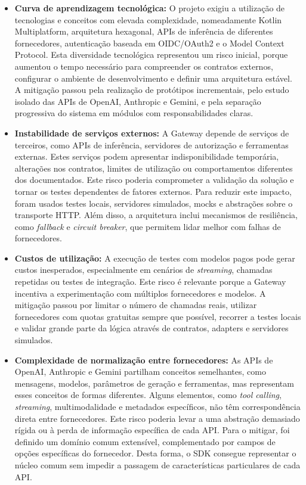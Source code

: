 \documentclass[11pt,a4paper]{report}
\begin{document}
    \begin{itemize}
        \item \textbf{Curva de aprendizagem tecnológica:}
        O projeto exigiu a utilização de tecnologias e conceitos com elevada complexidade, nomeadamente Kotlin Multiplatform, arquitetura hexagonal, APIs de inferência de diferentes fornecedores, autenticação baseada em OIDC/OAuth2 e o Model Context Protocol. Esta diversidade tecnológica representou um risco inicial, porque aumentou o tempo necessário para compreender os contratos externos, configurar o ambiente de desenvolvimento e definir uma arquitetura estável.
        A mitigação passou pela realização de protótipos incrementais, pelo estudo isolado das APIs de OpenAI, Anthropic e Gemini, e pela separação progressiva do sistema em módulos com responsabilidades claras.

        \item \textbf{Instabilidade de serviços externos:}
        A Gateway depende de serviços de terceiros, como APIs de inferência, servidores de autorização e ferramentas externas. Estes serviços podem apresentar indisponibilidade temporária, alterações nos contratos, limites de utilização ou comportamentos diferentes dos documentados. Este risco poderia comprometer a validação da solução e tornar os testes dependentes de fatores externos.
        Para reduzir este impacto, foram usados testes locais, servidores simulados, mocks e abstrações sobre o transporte HTTP. Além disso, a arquitetura inclui mecanismos de resiliência, como \textit{fallback} e \textit{circuit breaker}, que permitem lidar melhor com falhas de fornecedores.

        \item \textbf{Custos de utilização:}
        A execução de testes com modelos pagos pode gerar custos inesperados, especialmente em cenários de \textit{streaming}, chamadas repetidas ou testes de integração. Este risco é relevante porque a Gateway incentiva a experimentação com múltiplos fornecedores e modelos.
        A mitigação passou por limitar o número de chamadas reais, utilizar fornecedores com quotas gratuitas sempre que possível, recorrer a testes locais e validar grande parte da lógica através de contratos, adapters e servidores simulados.

        \item \textbf{Complexidade de normalização entre fornecedores:}
        As APIs de OpenAI, Anthropic e Gemini partilham conceitos semelhantes, como mensagens, modelos, parâmetros de geração e ferramentas, mas representam esses conceitos de formas diferentes. Alguns elementos, como \textit{tool calling}, \textit{streaming}, multimodalidade e metadados específicos, não têm correspondência direta entre fornecedores.
        Este risco poderia levar a uma abstração demasiado rígida ou à perda de informação específica de cada API. Para o mitigar, foi definido um domínio comum extensível, complementado por campos de opções específicas do fornecedor. Desta forma, o SDK consegue representar o núcleo comum sem impedir a passagem de características particulares de cada API.


\end{itemize}
\end{document}
